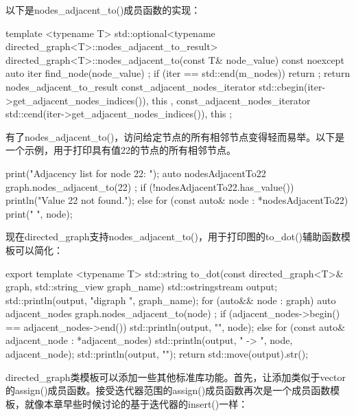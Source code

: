 以下是nodes\_adjacent\_to()成员函数的实现：

\begin{cpp}
template <typename T>
std::optional<typename directed_graph<T>::nodes_adjacent_to_result>
    directed_graph<T>::nodes_adjacent_to(const T& node_value) const noexcept
{
    auto iter { find_node(node_value) };
    if (iter == std::end(m_nodes)) { return {}; }
    return nodes_adjacent_to_result {
        const_adjacent_nodes_iterator {
            std::cbegin(iter->get_adjacent_nodes_indices()), this },
        const_adjacent_nodes_iterator {
            std::cend(iter->get_adjacent_nodes_indices()), this }
    };
}
\end{cpp}

有了nodes\_adjacent\_to()，访问给定节点的所有相邻节点变得轻而易举。以下是一个示例，用于打印具有值22的节点的所有相邻节点。

\begin{cpp}
print("Adjacency list for node 22: ");
auto nodesAdjacentTo22 { graph.nodes_adjacent_to(22) };
if (!nodesAdjacentTo22.has_value()) {
    println("Value 22 not found.");
} else {
    for (const auto& node : *nodesAdjacentTo22) { print("{} ", node); }
}
\end{cpp}


现在directed\_graph支持nodes\_adjacent\_to()，用于打印图的to\_dot()辅助函数模板可以简化：

\begin{cpp}
export template <typename T>
std::string to_dot(const directed_graph<T>& graph, std::string_view graph_name)
{
    std::ostringstream output;
    std::println(output, "digraph {} {{", graph_name);
    for (auto&& node : graph) {
        auto adjacent_nodes { graph.nodes_adjacent_to(node) };
        if (adjacent_nodes->begin() == adjacent_nodes->end()) {
            std::println(output, "{}", node);
        } else {
            for (const auto& adjacent_node : *adjacent_nodes) {
                std::println(output, "{} -> {}", node, adjacent_node);
            }
        }
    }
    std::println(output, "}}");
    return std::move(output).str();
}
\end{cpp}


directed\_graph类模板可以添加一些其他标准库功能。首先，让添加类似于vector的assign()成员函数。接受迭代器范围的assign()成员函数再次是一个成员函数模板，就像本章早些时候讨论的基于迭代器的insert()一样：

